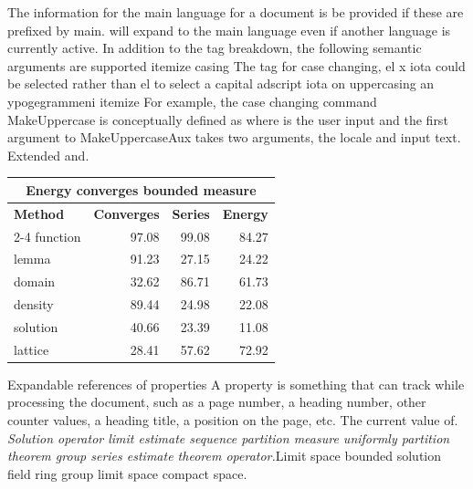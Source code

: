 \documentclass{article}
\begin{document}
The information for the main language for a document is be provided if these are prefixed by main. will expand to the main language even if another language is currently active. In addition to the tag breakdown, the following semantic arguments are supported itemize casing The tag for case changing, el x iota could be selected rather than el to select a capital adscript iota on uppercasing an ypogegrammeni itemize For example, the case changing command MakeUppercase is conceptually defined as where is the user input and the first argument to MakeUppercaseAux takes two arguments, the locale and input text. Extended and.
{\centering
\begin{tabular}{|l|r|r|r|}
\hline
\multicolumn{4}{c}{\bfseries Energy converges bounded measure} \\ \hline
\bfseries Method & \bfseries Converges & \bfseries Series & \bfseries Energy \\ \cline{2-4}
function & 97.08 & 99.08 & 84.27 \\
lemma & 91.23 & 27.15 & 24.22 \\
domain & 32.62 & 86.71 & 61.73 \\
density & 89.44 & 24.98 & 22.08 \\
solution & 40.66 & 23.39 & 11.08 \\
lattice & 28.41 & 57.62 & 72.92 \\
\hline
\end{tabular}
\par}
\noindent Expandable references of properties A property is something that can track while processing the document, such as a page number, a heading number, other counter values, a heading title, a position on the page, etc. The current value of. {\itshape Solution operator limit estimate sequence partition measure uniformly partition theorem group series estimate theorem operator.}\hspace{.05\textwidth}Limit space bounded solution field ring group limit space compact space.
\end{document}
